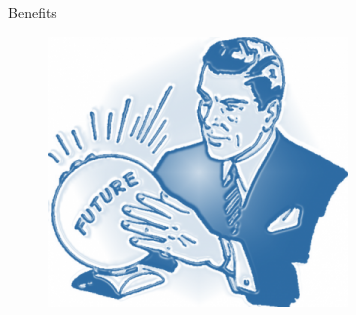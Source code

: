 \documentclass{beamer}
\begin{document}
\begin{frame}{Benefits}
	\begin{figure}[htpb]
		\centering
		\includegraphics[width=0.6\linewidth]{../img/prediction.png}
	\end{figure}
\end{frame}
\end{document}
